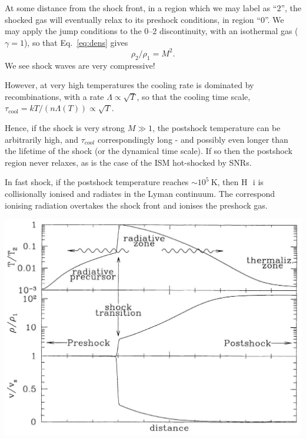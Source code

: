 At some distance from the shock front, in a region which we may label
as ``$2$'', the shocked gas will eventually relax to its preshock
conditions, in region ``0''. We may apply the jump conditions to the
0--2 discontinuity, with an isothermal gas ($\gamma = 1$), so that
Eq.~\ref{eq:dens} gives \[ \rho_2 / \rho_1 = M^2.\] We see shock waves
are very compressive!



However, at very high temperatures the cooling rate is dominated by
recombinations, with a rate $\Lambda \propto \sqrt{T}$, so that the
cooling time scale, $\tau_\mathrm{cool} = k T / (n \Lambda(T)) \propto
\sqrt{T}$. 

Hence, if the shock is very strong $M\gg1$, the postshock temperature
can be arbitrarily high, and $\tau_{cool}$ correspondingly long - and
possibly even longer than the lifetime of the shock (or the dynamical
time scale). If so then the postshock region never relaxes, as is the
case of the ISM hot-shocked by SNRs. 


In fast shock, if the postshock temperature reaches $\sim 10^5~$K,
then H~{\sc\,i} is collisionally ionised and radiates in the Lyman
continuum. The correspond ionising radiation overtakes the shock front
and ionises the preshock gas. 


\begin{center}
  \includegraphics[width=14cm,height=!]{./E/fig_Jshocks.jpg}
\end{center}




